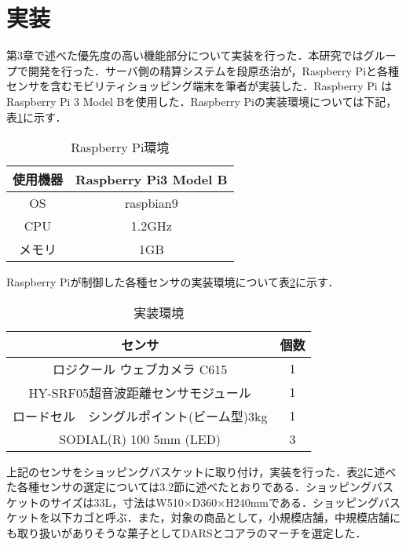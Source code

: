 

\section{実装}

第3章で述べた優先度の高い機能部分について実装を行った．本研究ではグループで開発を行った．サーバ側の精算システムを段原丞治が，Raspberry Piと各種センサを含むモビリティショッピング端末を筆者が実装した．Raspberry Pi はRaspberry Pi 3 Model Bを使用した．Raspberry Piの実装環境については下記，表\ref{rasp}に示す．


\begin{table}[htb]
\begin{center}
\caption{Raspberry Pi環境}
\begin{tabular}{|c||c|} \hline
使用機器 & Raspberry Pi3 Model B \\ \hline
OS & raspbian9 \\ \hline
CPU & 1.2GHz \\ \hline
メモリ & 1GB \\ \hline
\end{tabular}
\label{rasp}
\end{center}
\end{table}


Raspberry Piが制御した各種センサの実装環境について表\ref{jissou}に示す．


\begin{table}[htb]
\begin{center}
\caption{実装環境}
\begin{tabular}{|c|c|} \hline
センサ & 個数 \\ \hline \hline
ロジクール ウェブカメラ C615 & 1 \\
HY-SRF05超音波距離センサモジュール & 1 \\
ロードセル　シングルポイント(ビーム型)3kg & 1 \\
SODIAL(R) 100 5mm (LED) & 3 \\ \hline
\end{tabular}
\label{jissou}
\end{center}
\end{table}


上記のセンサをショッピングバスケットに取り付け，実装を行った．表\ref{jissou}に述べた各種センサの選定については3.2節に述べたとおりである．ショッピングバスケットのサイズは33L，寸法はW510×D360×H240mmである．ショッピングバスケットを以下カゴと呼ぶ．また，対象の商品として，小規模店舗，中規模店舗にも取り扱いがありそうな菓子としてDARSとコアラのマーチを選定した．

